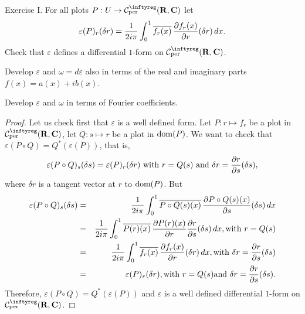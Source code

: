 \begin{Article}{Exercise I.}{}
  For all plots $P : U \to \Cinfty_{\rm per}(\RR,\CC)$ let
  $$
    \varepsilon(P)_r(\delta r) = {1 \over 2i\pi} \int_0^1
    \overline{f_r(x)} \, {\partial f_r(x) \over \partial r}(\delta r) \, dx.
    $$
   Check that $\varepsilon$ defines a differential $1$-form on $\Cinfty_{\rm per}(\RR,\CC)$.
  
   Develop $\varepsilon$ and $\omega = d\varepsilon$ also in terms of the real and imaginary parts $f(x) = a(x) + ib(x)$.
  
   Develop $\varepsilon$ and $\omega$ in terms of Fourier coefficients.
\end{Article}

\begin{proof}
  Let us check first that $\varepsilon$ is a well defined form. Let $P : r \mapsto f_r$ be a plot in $\Cinfty_{\rm per}(\RR,\CC)$, let $Q: s \mapsto r$ be a plot in $\mathrm{dom}(P)$. We want to
  check that $\varepsilon(P \circ Q) = Q^*(\varepsilon(P))$, that is,
  $$
    \varepsilon(P \circ Q)_s(\delta s) = \varepsilon(P)_r(\delta r) \ \text{with}\  r=Q(s) \ \text{and}\ 
    \delta r = {\partial r \over \partial s}(\delta s),
    $$
  where $\delta r$ is a tangent vector at $r$ to $\mathrm{dom}(P)$. But
  \begin{eqnarray*}
    \varepsilon(P \circ Q)_s(\delta s) & = & {1 \over 2i\pi} \int_0^1
    \overline{P \circ Q(s)(x)} \, {\partial P \circ Q(s)(x) \over \partial s}(\delta s) \, dx \\
    &=& {1 \over 2i\pi} \int_0^1
    \overline{P (r)(x)} \, {\partial P (r)(x) \over \partial r}{\partial r \over \partial s}(\delta s) \, dx,
    \mbox{with $r=Q(s)$} \\
    &=& {1 \over 2i\pi} \int_0^1
    \overline{f_r(x)} \, {\partial f_r(x) \over \partial r}(\delta r) \, dx,
    \mbox{with } \delta r = {\partial r \over \partial s}(\delta s) \\
    &=& \varepsilon(P)_r(\delta r), \mbox{with } r=Q(s) \mbox{and } \delta r = {\partial r \over \partial s}(\delta s).
  \end{eqnarray*}
  Therefore, $\varepsilon(P \circ Q)= Q^*(\varepsilon(P))$ and $\varepsilon$
  is a well defined differential $1$-form on $\Cinfty_{\rm per}(\RR,\CC)$.
  

\end{proof}
